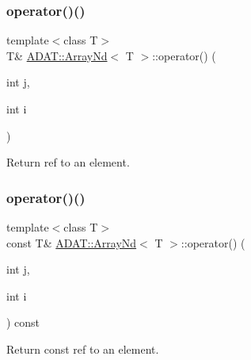 \subsubsection{\texorpdfstring{operator()()}{operator()()}\hspace{0.1cm}{\footnotesize\ttfamily [9/24]}}
{\footnotesize\ttfamily template$<$class T$>$ \\
T\& \mbox{\hyperlink{classADAT_1_1ArrayNd}{A\+D\+A\+T\+::\+Array\+Nd}}$<$ T $>$\+::operator() (\begin{DoxyParamCaption}\item[{int}]{j,  }\item[{int}]{i }\end{DoxyParamCaption})\hspace{0.3cm}{\ttfamily [inline]}}



Return ref to an element. 

\mbox{\label{classADAT_1_1ArrayNd_a476aa275f16078c90cb745312f344194}} 
\subsubsection{\texorpdfstring{operator()()}{operator()()}\hspace{0.1cm}{\footnotesize\ttfamily [10/24]}}
{\footnotesize\ttfamily template$<$class T$>$ \\
const T\& \mbox{\hyperlink{classADAT_1_1ArrayNd}{A\+D\+A\+T\+::\+Array\+Nd}}$<$ T $>$\+::operator() (\begin{DoxyParamCaption}\item[{int}]{j,  }\item[{int}]{i }\end{DoxyParamCaption}) const\hspace{0.3cm}{\ttfamily [inline]}}



Return const ref to an element. 

\mbox{\label{classADAT_1_1ArrayNd_a476aa275f16078c90cb745312f344194}} 
